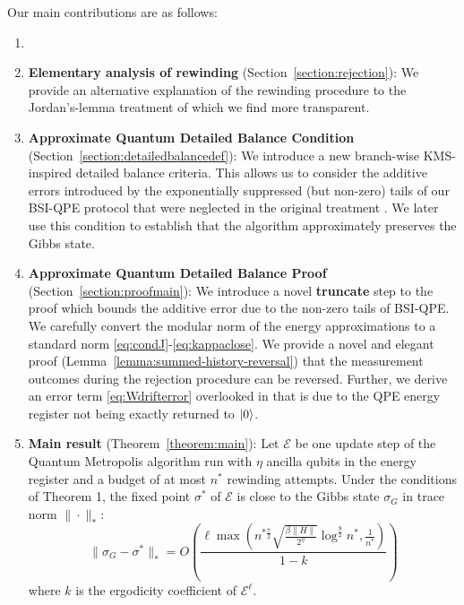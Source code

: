 Our main contributions are as follows:
\begin{enumerate}
    \item {} 
    \item \textbf{Elementary analysis of rewinding} (Section~\ref{section:rejection}): We provide an alternative explanation of the rewinding procedure to the Jordan's-lemma treatment of \cite{Temme_2011} which we find more transparent.
    \item \textbf{Approximate Quantum Detailed Balance Condition} (Section~\ref{section:detailedbalancedef}): We introduce a new branch-wise KMS-inspired detailed balance criteria. This allows us to consider the additive errors introduced by the exponentially suppressed (but non-zero) tails of our BSI-QPE protocol that were neglected in the original treatment \cite{Temme_2011}. We later use this condition to establish that the algorithm approximately preserves the Gibbs state.
    \item \textbf{Approximate Quantum Detailed Balance Proof} (Section~\ref{section:proofmain}): We introduce a novel \textbf{truncate} step to the proof which bounds the additive error due to the non-zero tails of BSI-QPE. We carefully convert the modular norm of the energy approximations to a standard norm \eqref{eq:condJ}-\eqref{eq:kappaclose}. We provide a novel and elegant proof (Lemma~\ref{lemma:summed-history-reversal}) that the measurement outcomes during the rejection procedure can be reversed. Further, we derive an error term \eqref{eq:Wdrifterror} overlooked in \cite{Temme_2011} that is due to the QPE energy register not being exactly returned to $\ket{0}$.
    \item \textbf{Main result} (Theorem~\ref{theorem:main}): Let $\mathcal{E}$ be one  update step of the Quantum Metropolis algorithm run with $\eta$ ancilla qubits in the energy register and a budget of at most $n^*$ rewinding attempts. Under the conditions of Theorem 1, the fixed point $\sigma^*$ of $\mathcal{E}$ is close to the Gibbs state $\sigma_G$ in trace norm $\|\cdot\|_*$:
    \begin{equation}
       \|\sigma_G- \sigma^*\|_* = O\left(\frac{\ell\max\left( n^{*\frac{7}{2}}\sqrt{\frac{\beta\|H\| }{2^{\eta}}}\log^{\frac{9}{2}}n^*,\frac{1}{n^*}\right)}{1-k}\right)
    \end{equation}
    where $k$ is the ergodicity coefficient of $\mathcal{E}^\ell$.
\end{enumerate}

